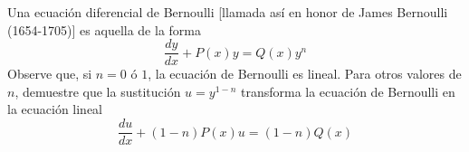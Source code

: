 \item Una ecuación diferencial de Bernoulli [llamada así en honor de James Bernoulli (1654-1705)] es aquella de la forma
    \[ \frac{dy}{dx} + P(x)y = Q(x)y^n \]
    Observe que, si $n = 0$ ó $1$, la ecuación de Bernoulli es lineal. Para otros valores de $n$, demuestre que la sustitución $u = y^{1-n}$ transforma la ecuación de Bernoulli en la ecuación lineal
    \[ \frac{du}{dx} + (1 - n)P(x)u = (1 - n)Q(x) \]
